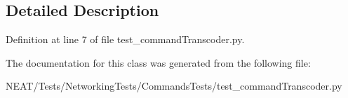 \subsection{Detailed Description}


Definition at line 7 of file test\+\_\+command\+Transcoder.\+py.



The documentation for this class was generated from the following file\+:\begin{DoxyCompactItemize}
\item 
N\+E\+A\+T/\+Tests/\+Networking\+Tests/\+Commands\+Tests/test\+\_\+command\+Transcoder.\+py\end{DoxyCompactItemize}
